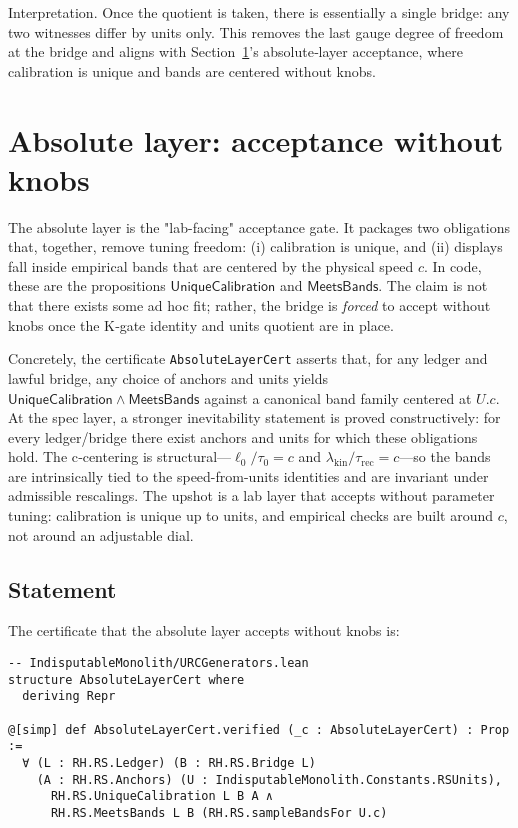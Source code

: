\documentclass[11pt,a4paper,twoside]{article}
\numberwithin{equation}{section}
\theoremstyle{customthm}
\theoremstyle{customdef}
\theoremstyle{customrem}
\begin{document}
Interpretation. Once the quotient is taken, there is essentially a single bridge: any two witnesses differ by units only. This removes the last gauge degree of freedom at the bridge and aligns with Section~\ref{sec:absolute}'s absolute‐layer acceptance, where calibration is unique and bands are centered without knobs.

\section{Absolute layer: acceptance without knobs}\label{sec:absolute}

The absolute layer is the "lab-facing" acceptance gate. It packages two obligations that, together, remove tuning freedom: (i) calibration is unique, and (ii) displays fall inside empirical bands that are centered by the physical speed \(c\). In code, these are the propositions \(\mathsf{UniqueCalibration}\) and \(\mathsf{MeetsBands}\). The claim is not that there exists some ad hoc fit; rather, the bridge is \emph{forced} to accept without knobs once the K‑gate identity and units quotient are in place. 

Concretely, the certificate \texttt{AbsoluteLayerCert} asserts that, for any ledger and lawful bridge, any choice of anchors and units yields \(\mathsf{UniqueCalibration}\wedge\mathsf{MeetsBands}\) against a canonical band family centered at \(U.c\). At the spec layer, a stronger inevitability statement is proved constructively: for every ledger/bridge there exist anchors and units for which these obligations hold. The c‑centering is structural—\(\ell_0/\tau_0 = c\) and \(\lambda_{\mathrm{kin}}/\tau_{\mathrm{rec}} = c\)—so the bands are intrinsically tied to the speed-from-units identities and are invariant under admissible rescalings. The upshot is a lab layer that accepts without parameter tuning: calibration is unique up to units, and empirical checks are built around \(c\), not around an adjustable dial.

\subsection{Statement}

\noindent The certificate that the absolute layer accepts without knobs is:

\begin{lstlisting}
-- IndisputableMonolith/URCGenerators.lean
structure AbsoluteLayerCert where
  deriving Repr

@[simp] def AbsoluteLayerCert.verified (_c : AbsoluteLayerCert) : Prop :=
  ∀ (L : RH.RS.Ledger) (B : RH.RS.Bridge L)
    (A : RH.RS.Anchors) (U : IndisputableMonolith.Constants.RSUnits),
      RH.RS.UniqueCalibration L B A ∧
      RH.RS.MeetsBands L B (RH.RS.sampleBandsFor U.c)
\end{lstlisting}
\end{document}
